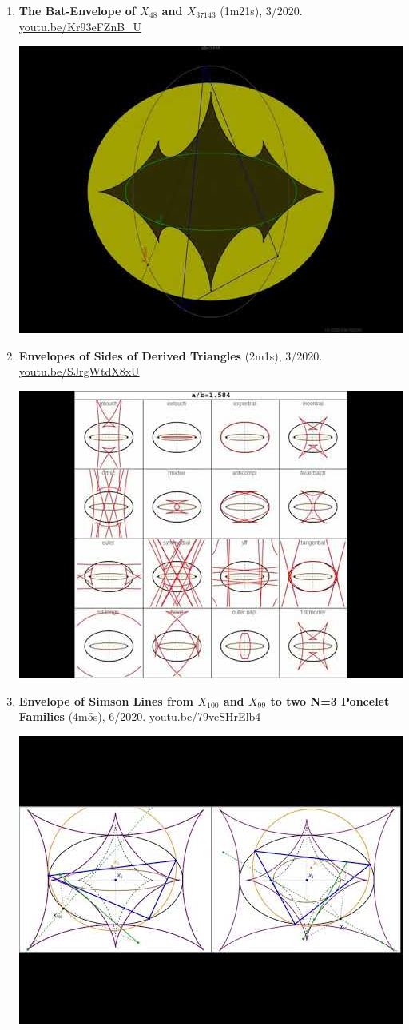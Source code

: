 \documentclass[12pt]{article}
\begin{document}
\begin{enumerate}[resume]
% 
\item \textbf{The Bat-Envelope of $X_{48}$ and $X_{37143}$} (1m21s), 3/2020. \href{https://youtu.be/Kr93eFZnB_U}{\url{youtu.be/Kr93eFZnB\_U}}
\begin{center}\includegraphics[width=.5\textwidth]{pics/Kr93eFZnB_U.jpg}\end{center}
% 
\item \textbf{Envelopes of Sides of Derived Triangles} (2m1s), 3/2020. \href{https://youtu.be/SJrgWtdX8xU}{\url{youtu.be/SJrgWtdX8xU}}
\begin{center}\includegraphics[width=.5\textwidth]{pics/SJrgWtdX8xU.jpg}\end{center}
% 
\item \textbf{Envelope of Simson Lines from $X_{100}$ and $X_{99}$ to two N=3 Poncelet Families} (4m5s), 6/2020. \href{https://youtu.be/79veSHrElb4}{\url{youtu.be/79veSHrElb4}}
\begin{center}\includegraphics[width=.5\textwidth]{pics/79veSHrElb4.jpg}\end{center}
% 
\end{enumerate}
\end{document}
